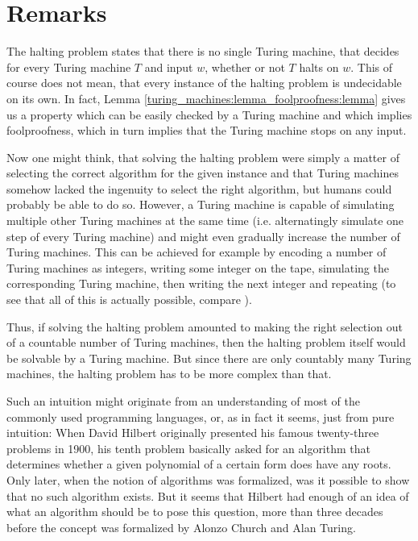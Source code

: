 \section{Remarks}
\label{remarks}

\begin{Remark}
	\label{remarks:scope_of_halting_problem}
	The halting problem states that there is no single Turing machine, that decides for every Turing machine $T$ and input $w$, whether or not $T$ halts on $w$.
	This of course does not mean, that every instance of the halting problem is undecidable on its own.
	In fact, Lemma \ref{turing_machines:lemma_foolproofness:lemma} gives us a property which can be easily checked by a Turing machine and which implies foolproofness, which in turn implies that the Turing machine stops on any input.

	Now one might think, that solving the halting problem were simply a matter of selecting the correct algorithm for the given instance and that Turing machines somehow lacked the ingenuity to select the right algorithm, but humans could probably be able to do so.
	However, a Turing machine is capable of simulating multiple other Turing machines at the same time (i.e. alternatingly simulate one step of every Turing machine) and might even gradually increase the number of Turing machines.
	This can be achieved for example by encoding a number of Turing machines as integers, writing some integer on the tape, simulating the corresponding Turing machine, then writing the next integer and repeating (to see that all of this is actually possible, compare \cite{sip06}).

	Thus, if solving the halting problem amounted to making the right selection out of a countable number of Turing machines, then the halting problem itself would be solvable by a Turing machine.
	But since there are only countably many Turing machines, the halting problem has to be more complex than that.
\end{Remark}

\begin{Remark}
	\label{remarks:intuitive_algorithms}
	Such an intuition might originate from an understanding of most of the commonly used programming languages, or, as in fact it seems, just from pure intuition: When David Hilbert originally presented his famous twenty-three problems in 1900, his tenth problem basically asked for an algorithm that determines whether a given polynomial of a certain form does have any roots.
	Only later, when the notion of algorithms was formalized, was it possible to show that no such algorithm exists.
	But it seems that Hilbert had enough of an idea of what an algorithm should be to pose this question, more than three decades before the concept was formalized by Alonzo Church and Alan Turing.
\end{Remark}

